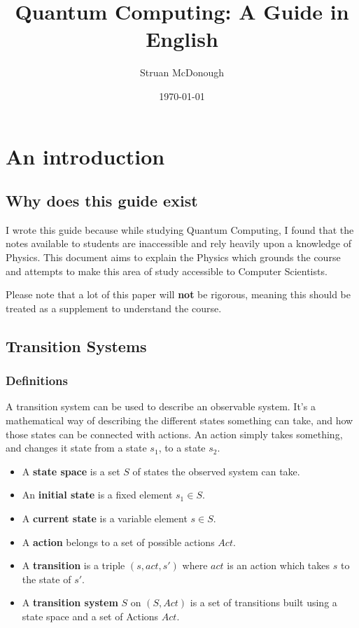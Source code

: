 \documentclass[12pt]{article}
\begin{document}
	\title{Quantum Computing: A Guide in English}     
	\author{Struan McDonough}
	\date{\today}
	\maketitle
	
\section{An introduction}

\subsection{Why does this guide exist}

I wrote this guide because while studying Quantum Computing, I found that the notes available to students are inaccessible and rely heavily upon a knowledge of Physics. This document aims to explain the Physics which grounds the course and attempts to make this area of study accessible to Computer Scientists.

Please note that a lot of this paper will \textbf{not} be rigorous, meaning this should be treated as a supplement to understand the course. 

\subsection{Transition Systems}

\subsubsection{Definitions}

A transition system can be used to describe an observable system. It's a mathematical way of describing the different states something can take, and how those states can be connected with actions. An action simply takes something, and changes it state from a state $s_1$, to a state $s_2$.

\begin{itemize}
\item A \textbf{state space} is a set $S$ of states the observed system can take.
\item An \textbf{initial state} is a fixed element $s_1 \in S$.
\item A \textbf{current state} is a variable element $s \in S$.
\item A \textbf{action} belongs to a set of possible actions $Act$.
\item A \textbf{transition} is a triple $(s, act, s')$ where $act$ is an action which takes $s$ to the state of $s'$.
\item A \textbf{transition system} $S$ on $(S, Act)$ is a set of transitions built using a state space and a set of Actions $Act$.
\end{itemize}
\end{document}
